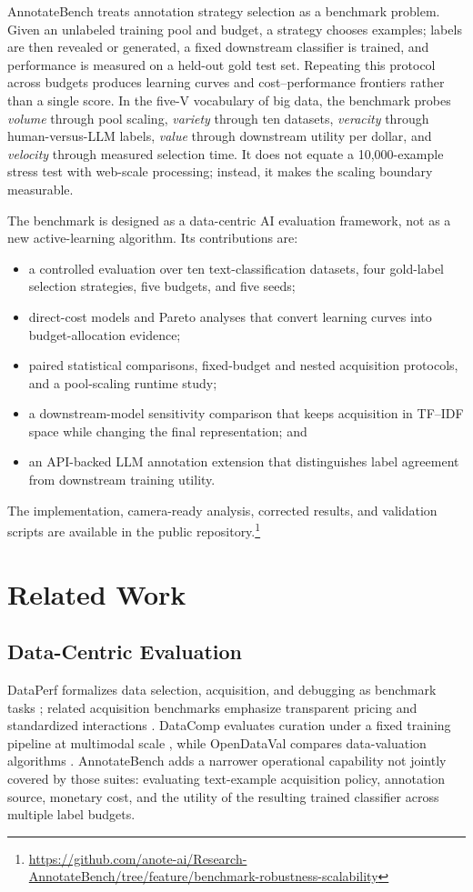 \documentclass[conference]{IEEEtran}
\begin{document}
AnnotateBench treats annotation strategy selection as a benchmark problem. Given an unlabeled training pool and budget, a strategy chooses examples; labels are then revealed or generated, a fixed downstream classifier is trained, and performance is measured on a held-out gold test set. Repeating this protocol across budgets produces learning curves and cost--performance frontiers rather than a single score. In the five-V vocabulary of big data, the benchmark probes \emph{volume} through pool scaling, \emph{variety} through ten datasets, \emph{veracity} through human-versus-LLM labels, \emph{value} through downstream utility per dollar, and \emph{velocity} through measured selection time. It does not equate a 10,000-example stress test with web-scale processing; instead, it makes the scaling boundary measurable.

The benchmark is designed as a data-centric AI evaluation framework, not as a new active-learning algorithm. Its contributions are:
\begin{itemize}
    \item a controlled evaluation over ten text-classification datasets, four gold-label selection strategies, five budgets, and five seeds;
    \item direct-cost models and Pareto analyses that convert learning curves into budget-allocation evidence;
    \item paired statistical comparisons, fixed-budget and nested acquisition protocols, and a pool-scaling runtime study;
    \item a downstream-model sensitivity comparison that keeps acquisition in TF--IDF space while changing the final representation; and
    \item an API-backed LLM annotation extension that distinguishes label agreement from downstream training utility.
\end{itemize}

The implementation, camera-ready analysis, corrected results, and validation scripts are available in the public repository.\footnote{\url{https://github.com/anote-ai/Research-AnnotateBench/tree/feature/benchmark-robustness-scalability}}

\section{Related Work}

\subsection{Data-Centric Evaluation}
DataPerf formalizes data selection, acquisition, and debugging as benchmark tasks \cite{mazumder2022dataperf}; related acquisition benchmarks emphasize transparent pricing and standardized interactions \cite{chen2023dataacquisition}. DataComp evaluates curation under a fixed training pipeline at multimodal scale \cite{gadre2023datacomp}, while OpenDataVal compares data-valuation algorithms \cite{jiang2023opendataval}. AnnotateBench adds a narrower operational capability not jointly covered by those suites: evaluating text-example acquisition policy, annotation source, monetary cost, and the utility of the resulting trained classifier across multiple label budgets.
\end{document}
